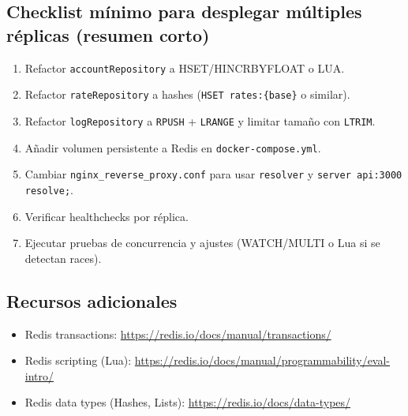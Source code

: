 \subsection{Checklist mínimo para desplegar múltiples réplicas (resumen corto)}

\begin{enumerate}[leftmargin=*]
    \item[] \framebox{$\square$} Refactor \texttt{accountRepository} a HSET/HINCRBYFLOAT o LUA.
    \item[] \framebox{$\square$} Refactor \texttt{rateRepository} a hashes (\texttt{HSET rates:\{base\}} o similar).
    \item[] \framebox{$\square$} Refactor \texttt{logRepository} a \texttt{RPUSH} + \texttt{LRANGE} y limitar tamaño con \texttt{LTRIM}.
    \item[] \framebox{$\square$} Añadir volumen persistente a Redis en \texttt{docker-compose.yml}.
    \item[] \framebox{$\square$} Cambiar \texttt{nginx\_reverse\_proxy.conf} para usar \texttt{resolver} y \texttt{server api:3000 resolve;}.
    \item[] \framebox{$\square$} Verificar healthchecks por réplica.
    \item[] \framebox{$\square$} Ejecutar pruebas de concurrencia y ajustes (WATCH/MULTI o Lua si se detectan races).
\end{enumerate}

\subsection{Recursos adicionales}

\begin{itemize}[leftmargin=*]
    \item Redis transactions: \url{https://redis.io/docs/manual/transactions/}
    \item Redis scripting (Lua): \url{https://redis.io/docs/manual/programmability/eval-intro/}
    \item Redis data types (Hashes, Lists): \url{https://redis.io/docs/data-types/}
\end{itemize}